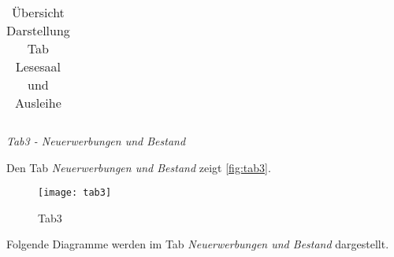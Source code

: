 \begin{table}[H]
\begin{adjustbox}{max width=\textwidth}
\begin{tabular}{p{}p{}p{}p{}p{}p{}}
        \bottomrule
        \end{tabular}
        \end{adjustbox}
        \caption{%
            Übersicht Darstellung Tab Lesesaal und Ausleihe
        }
        \label{tab:Darstellung Tab Lesesaal und Ausleihe}
        \end{table}
    \endgroup



    \clearpage
    \noindent
    \textit{Tab3 - Neuerwerbungen und Bestand}
    
    Den Tab \textit{Neuerwerbungen und Bestand} zeigt \autoref{fig:tab3}.

    
    \begin{figure}[H]
        \centering
            \texttt{[image: tab3]}
            \caption{Tab3}
            \label{fig:tab3}
    \end{figure}

    \clearpage
    Folgende Diagramme werden im Tab \textit{Neuerwerbungen und Bestand} dargestellt.
    

